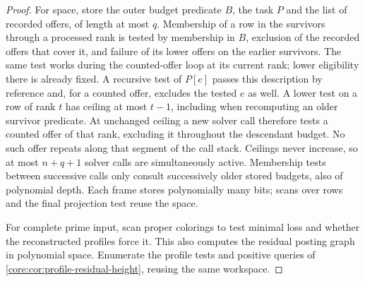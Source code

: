 \begin{proof}
For space, store the outer budget predicate $B$, the task $P$ and
the list of recorded offers, of length at most $q$. Membership of
a row in the survivors through a processed rank is tested by
membership in $B$, exclusion of the recorded offers that cover it,
and failure of its lower offers on the earlier survivors. The same
test works during the counted-offer loop at its current rank;
lower eligibility there is already fixed. A recursive test of
$P[e]$ passes this description by reference and, for a counted
offer, excludes the tested $e$ as well. A lower test on a row of
rank $t$ has ceiling at most $t-1$, including when recomputing an
older survivor predicate. At unchanged ceiling a new solver call
therefore tests a counted offer of that rank, excluding it throughout
the descendant budget. No such offer repeats along that segment
of the call stack. Ceilings never increase, so at most $n+q+1$
solver calls are simultaneously active. Membership tests between
successive calls only consult successively older stored budgets,
also of polynomial depth. Each frame stores polynomially many bits;
scans over rows and the final projection test reuse the space.

For complete prime input, scan proper colorings to test minimal
loss and whether the reconstructed profiles force it. This also
computes the residual posting graph in polynomial space. Enumerate
the profile tests and positive queries of
\cref{core:cor:profile-residual-height}, reusing the same workspace.
\end{proof}

